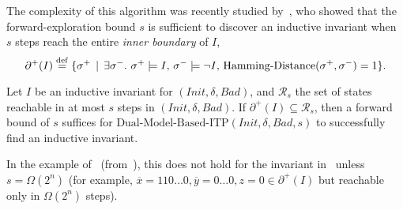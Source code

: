 \documentclass[acmsmall,screen]{acmart}
\newcommand{\ov}{\overline}
\newcommand{\Init}{{\textit{Init}}}
\newcommand{\Bad}{\textit{Bad}}
\newcommand{\tr}{\delta}
\renewcommand{\vec}{\ov}
\newcommand{\set}[1]{\{{#1}\}}
\newcommand{\eqdef}{\stackrel{\rm def}{=}}
\newcommand{\boundarypos}[1]{\partial^{+}({#1})}
\begin{document}
The complexity of this algorithm was recently studied by~\citet{DBLP:journals/pacmpl/FeldmanSSW21}, who showed that the forward-exploration bound $s$ is sufficient to discover an inductive invariant when $s$ steps reach the entire \emph{inner boundary} of $I$,
\iflong\else
\vspace{0.3cm}
\fi
%
\begin{equation*}
	\boundarypos{I} \eqdef \set{\sigma^+ \, \mid \, \exists \sigma^-. \ \sigma^+ \models I, \, \sigma^- \models \neg I, \, \mbox{Hamming-Distance}(\sigma^+,\sigma^-)=1}.
\end{equation*}
\begin{theorem}
\label{lem:itp-fence-condition}
Let $I$ be an inductive invariant for $(\Init,\tr,\Bad)$,
and $\mathcal{R}_s$ the set of states reachable in at most $s$ steps in $(\Init,\tr,\Bad)$.
If
%
%
%
$\boundarypos{I} \subseteq \mathcal{R}_s$,
then a forward bound of $s$ suffices for $\mbox{Dual-Model-Based-ITP}(\Init,\tr,\Bad,s)$ to successfully find an inductive invariant.
\end{theorem}
%
%
%
%
%
%
%
%
%
%
%
%
%
%
%
%
%
%
%
%
%
%
%
%
%
%
%
%
In the example of~ (from~), this does not hold for the invariant in~ unless $s=\Omega(2^n)$ (for example, $\vec{x}=110\ldots0,\vec{y}=0\ldots0,z=0 \in \boundarypos{I}$ but reachable only in $\Omega(2^n)$ steps).
%
%

%
%

%
%

%

%

%
%

%
%
%
%
%
%
%
%
%
%
%
%
%
%
%
%
%
%
%
%
%
%
%
%

%
%
%

%
%
%

%
%

%
%
%

%
\end{document}
